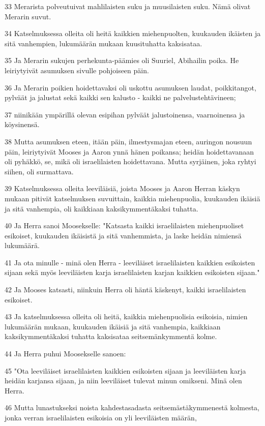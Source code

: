 \par 33 Merarista polveutuivat mahlilaisten suku ja muusilaisten suku. Nämä olivat Merarin suvut.
\par 34 Katselmuksessa olleita oli heitä kaikkien miehenpuolten, kuukauden ikäisten ja sitä vanhempien, lukumäärän mukaan kuusituhatta kaksisataa.
\par 35 Ja Merarin sukujen perhekunta-päämies oli Suuriel, Abihailin poika. He leiriytyivät asumuksen sivulle pohjoiseen päin.
\par 36 Ja Merarin poikien hoidettavaksi oli uskottu asumuksen laudat, poikkitangot, pylväät ja jalustat sekä kaikki sen kalusto - kaikki ne palvelustehtävineen;
\par 37 niinikään ympärillä olevan esipihan pylväät jalustoinensa, vaarnoinensa ja köysinensä.
\par 38 Mutta asumuksen eteen, itään päin, ilmestysmajan eteen, auringon nousuun päin, leiriytyivät Mooses ja Aaron ynnä hänen poikansa; heidän hoidettavanaan oli pyhäkkö, se, mikä oli israelilaisten hoidettavana. Mutta syrjäinen, joka ryhtyi siihen, oli surmattava.
\par 39 Katselmuksessa olleita leeviläisiä, joista Mooses ja Aaron Herran käskyn mukaan pitivät katselmuksen suvuittain, kaikkia miehenpuolia, kuukauden ikäisiä ja sitä vanhempia, oli kaikkiaan kaksikymmentäkaksi tuhatta.
\par 40 Ja Herra sanoi Moosekselle: "Katsasta kaikki israelilaisten miehenpuoliset esikoiset, kuukauden ikäisistä ja sitä vanhemmista, ja laske heidän nimiensä lukumäärä.
\par 41 Ja ota minulle - minä olen Herra - leeviläiset israelilaisten kaikkien esikoisten sijaan sekä myös leeviläisten karja israelilaisten karjan kaikkien esikoisten sijaan."
\par 42 Ja Mooses katsasti, niinkuin Herra oli häntä käskenyt, kaikki israelilaisten esikoiset.
\par 43 Ja katselmuksessa olleita oli heitä, kaikkia miehenpuolisia esikoisia, nimien lukumäärän mukaan, kuukauden ikäisiä ja sitä vanhempia, kaikkiaan kaksikymmentäkaksi tuhatta kaksisataa seitsemänkymmentä kolme.
\par 44 Ja Herra puhui Moosekselle sanoen:
\par 45 "Ota leeviläiset israelilaisten kaikkien esikoisten sijaan ja leeviläisten karja heidän karjansa sijaan, ja niin leeviläiset tulevat minun omikseni. Minä olen Herra.
\par 46 Mutta lunastukseksi noista kahdestasadasta seitsemästäkymmenestä kolmesta, jonka verran israelilaisten esikoisia on yli leeviläisten määrän,
